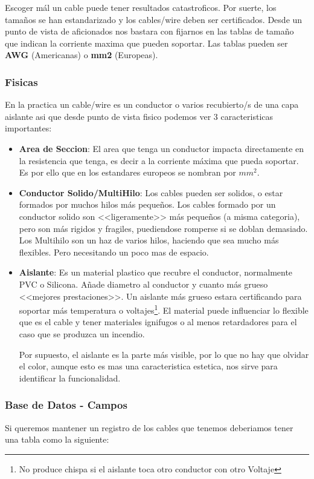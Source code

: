 Escoger mál un cable puede tener resultados catastroficos. Por suerte, los tamaños se han estandarizado y los cables/wire deben ser certificados. Desde un punto de vista de aficionados nos bastara con fijarnos en las tablas de tamaño que indican la corriente maxima que pueden soportar. Las tablas pueden ser \textbf{AWG} (Americanas) o \textbf{mm2} (Europeas).

\subsubsection{Fisicas}
En la practica un cable/wire es un conductor o varios recubierto/s de una capa aislante asi que
desde punto de vista fisico podemos ver 3 caracteristicas importantes:
\begin{itemize}
\item \textbf{Area de Seccion}: El area que tenga un conductor impacta directamente en la resistencia que tenga, es decir a la corriente máxima que pueda soportar. Es por ello que en los estandares europeos se nombran por $mm^2$. 
\item \textbf{Conductor Solido/MultiHilo}: Los cables pueden ser solidos, o estar formados por muchos hilos más pequeños. Los cables formado por un conductor solido son <<ligeramente>> más pequeños (a misma categoria), pero son más rigidos y fragiles, puediendose romperse si se doblan demasiado. Los Multihilo son un haz de varios hilos, haciendo que sea mucho más flexibles. Pero necesitando un poco mas de espacio.
\item \textbf{Aislante}: Es un material plastico que recubre el conductor, normalmente PVC o Silicona. Añade diametro al conductor y cuanto más grueso <<mejores prestaciones>>. Un aislante más grueso estara certificando para soportar más temperatura o voltajes\footnote{No produce chispa si el aislante toca otro conductor con otro Voltaje}. El material puede influenciar lo flexible que es el cable y tener materiales ignifugos o al menos retardadores para el caso que se produzca un incendio. 

Por supuesto, el aislante es la parte más visible, por lo que no hay que olvidar el color, aunque esto es mas una caracteristica estetica, nos sirve para identificar la funcionalidad.
\end{itemize}

\subsubsection{Base de Datos - Campos}
Si queremos mantener un registro de los cables que tenemos deberiamos tener una tabla como la siguiente:

